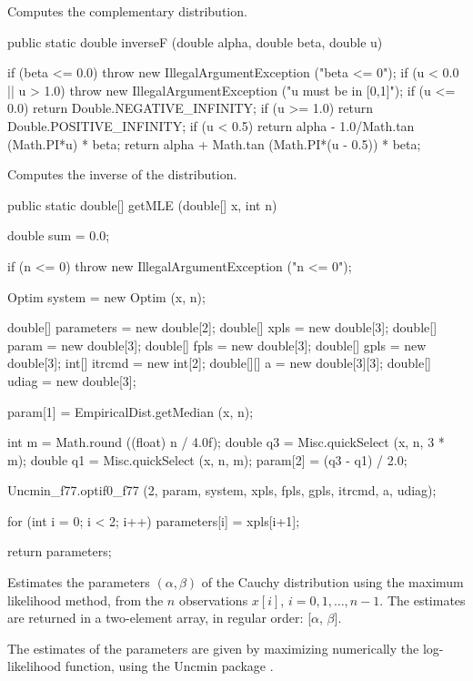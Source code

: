   \begin{tabb}
  Computes the complementary distribution.
 \end{tabb}
\begin{code}

   public static double inverseF (double alpha, double beta, double u)\begin{hide} {
      if (beta <= 0.0)
         throw new IllegalArgumentException ("beta <= 0");
     if (u < 0.0 || u > 1.0)
        throw new IllegalArgumentException ("u must be in [0,1]");
     if (u <= 0.0)
        return Double.NEGATIVE_INFINITY;
     if (u >= 1.0)
        return Double.POSITIVE_INFINITY;
     if (u < 0.5)
        return alpha - 1.0/Math.tan (Math.PI*u) * beta;
     return alpha + Math.tan (Math.PI*(u - 0.5)) * beta;
   }\end{hide}
\end{code}
  \begin{tabb}
  Computes the inverse of the distribution.
 \end{tabb}
\begin{code}

   public static double[] getMLE (double[] x, int n)\begin{hide} {
      double sum = 0.0;

      if (n <= 0)
         throw new IllegalArgumentException ("n <= 0");

      Optim system = new Optim (x, n);

      double[] parameters = new double[2];
      double[] xpls = new double[3];
      double[] param = new double[3];
      double[] fpls = new double[3];
      double[] gpls = new double[3];
      int[] itrcmd = new int[2];
      double[][] a = new double[3][3];
      double[] udiag = new double[3];

      param[1] = EmpiricalDist.getMedian (x, n);

      int m = Math.round ((float) n / 4.0f);
      double q3 = Misc.quickSelect (x, n, 3 * m);
      double q1 = Misc.quickSelect (x, n, m);
      param[2] = (q3 - q1) / 2.0;

      Uncmin_f77.optif0_f77 (2, param, system, xpls, fpls, gpls, itrcmd, a, udiag);

      for (int i = 0; i < 2; i++)
         parameters[i] = xpls[i+1];

      return parameters;
   }\end{hide}
\end{code}
\begin{tabb}
  Estimates the parameters $(\alpha,\beta)$ of the Cauchy distribution
  using the maximum likelihood method, from the $n$ observations
   $x[i]$, $i = 0, 1,\ldots, n-1$. The estimates are returned in a two-element
    array, in regular order: [$\alpha$, $\beta$].
   \begin{detailed}
   The estimates of the parameters are given by maximizing numerically the
   log-likelihood function, using the Uncmin package \cite{iSCHa,iVERa}.
   \end{detailed}
\end{tabb}
